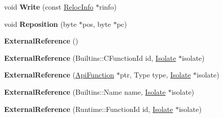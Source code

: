 \begin{DoxyCompactItemize}
\item 
\hypertarget{classv8_1_1internal_1_1_b_a_s_e___e_m_b_e_d_d_e_d_a8886e1565720fda562dfe4c17c83ca67}{}void {\bfseries Write} (const \hyperlink{classv8_1_1internal_1_1_reloc_info}{Reloc\+Info} $\ast$rinfo)\label{classv8_1_1internal_1_1_b_a_s_e___e_m_b_e_d_d_e_d_a8886e1565720fda562dfe4c17c83ca67}

\item 
\hypertarget{classv8_1_1internal_1_1_b_a_s_e___e_m_b_e_d_d_e_d_a4702d949eb49d67812c76eb6b1b03c7a}{}void {\bfseries Reposition} (byte $\ast$pos, byte $\ast$pc)\label{classv8_1_1internal_1_1_b_a_s_e___e_m_b_e_d_d_e_d_a4702d949eb49d67812c76eb6b1b03c7a}

\item 
\hypertarget{classv8_1_1internal_1_1_b_a_s_e___e_m_b_e_d_d_e_d_a0e38547f60fb33307b61d3638b52b566}{}{\bfseries External\+Reference} ()\label{classv8_1_1internal_1_1_b_a_s_e___e_m_b_e_d_d_e_d_a0e38547f60fb33307b61d3638b52b566}

\item 
\hypertarget{classv8_1_1internal_1_1_b_a_s_e___e_m_b_e_d_d_e_d_ad5ca73c8e7eb64fdd3498bb2069e047e}{}{\bfseries External\+Reference} (Builtins\+::\+C\+Function\+Id id, \hyperlink{classv8_1_1internal_1_1_isolate}{Isolate} $\ast$isolate)\label{classv8_1_1internal_1_1_b_a_s_e___e_m_b_e_d_d_e_d_ad5ca73c8e7eb64fdd3498bb2069e047e}

\item 
\hypertarget{classv8_1_1internal_1_1_b_a_s_e___e_m_b_e_d_d_e_d_af55ca1b7fc0441ef43d9d0994e01eef9}{}{\bfseries External\+Reference} (\hyperlink{classv8_1_1_api_function}{Api\+Function} $\ast$ptr, Type type, \hyperlink{classv8_1_1internal_1_1_isolate}{Isolate} $\ast$isolate)\label{classv8_1_1internal_1_1_b_a_s_e___e_m_b_e_d_d_e_d_af55ca1b7fc0441ef43d9d0994e01eef9}

\item 
\hypertarget{classv8_1_1internal_1_1_b_a_s_e___e_m_b_e_d_d_e_d_a5bc8d69cca852f0df7d01f1ae53a1e84}{}{\bfseries External\+Reference} (Builtins\+::\+Name name, \hyperlink{classv8_1_1internal_1_1_isolate}{Isolate} $\ast$isolate)\label{classv8_1_1internal_1_1_b_a_s_e___e_m_b_e_d_d_e_d_a5bc8d69cca852f0df7d01f1ae53a1e84}

\item 
\hypertarget{classv8_1_1internal_1_1_b_a_s_e___e_m_b_e_d_d_e_d_a31ba0940e025a8df40d17b8866d54112}{}{\bfseries External\+Reference} (Runtime\+::\+Function\+Id id, \hyperlink{classv8_1_1internal_1_1_isolate}{Isolate} $\ast$isolate)\label{classv8_1_1internal_1_1_b_a_s_e___e_m_b_e_d_d_e_d_a31ba0940e025a8df40d17b8866d54112}


\end{DoxyCompactItemize}
